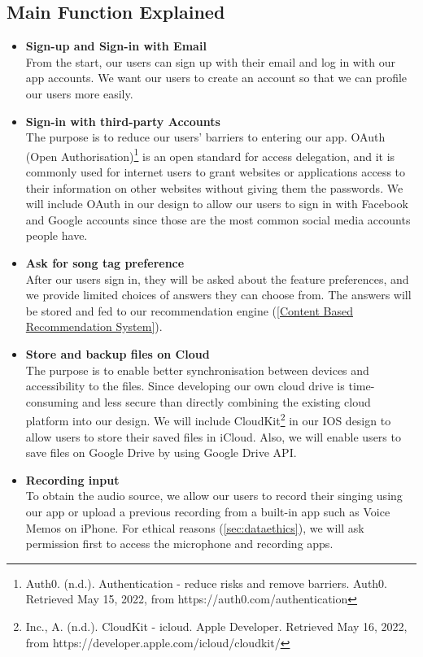 \documentclass[11pt]{article}
\begin{document}
 \subsection{Main Function Explained}

\begin{itemize}

\item \textbf{Sign-up and Sign-in with Email}
\\From the start, our users can sign up with their email and log in with our app accounts. We want our users to create an account so that we can profile our users more easily.

\item \textbf{Sign-in with third-party Accounts}
\\ The purpose is to reduce our users' barriers to entering our app. OAuth (Open Authorisation)\footnote{Auth0. (n.d.). Authentication - reduce risks and remove barriers. Auth0. Retrieved May 15, 2022, from https://auth0.com/authentication } is an open standard for access delegation, and it is commonly used for internet users to grant websites or applications access to their information on other websites without giving them the passwords. We will include OAuth in our design to allow our users to sign in with Facebook and Google accounts since those are the most common social media accounts people have.

\item \textbf{Ask for song tag preference}
\\After our users sign in, they will be asked about the feature preferences, and we provide limited choices of answers they can choose from. The answers will be stored and fed to our recommendation engine (\cref{Content Based Recommendation System}). 

\item \textbf{Store and backup files on Cloud}
\\The purpose is to enable better synchronisation between devices and accessibility to the files. Since developing our own cloud drive is time-consuming and less secure than directly combining the existing cloud platform into our design. 
We will include CloudKit\footnote{Inc., A. (n.d.). CloudKit - icloud. Apple Developer. Retrieved May 16, 2022, from https://developer.apple.com/icloud/cloudkit/} in our IOS design to allow users to store their saved files in iCloud. Also, we will enable users to save files on Google Drive by using Google Drive API.

\item \textbf{Recording input}
\\ To obtain the audio source, we allow our users to record their singing using our app or upload a previous recording 
from a built-in app such as Voice Memos on iPhone. For ethical reasons (\cref{sec:dataethics}), we will ask permission first to access the microphone and recording apps.


\end{itemize}
\end{document}
